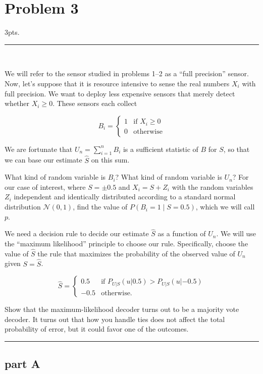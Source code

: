 \documentclass[12pt,a4paper]{article}
\begin{document}
\clearpage

\section{Problem 3}
3pts.\\

\hrule 

\

\noindent We will refer to the sensor studied in problems 1--2 as a ``full precision'' sensor. Now, let's suppose that it is resource intensive to sense the real numbers $X_i$ with full precision. We want to deploy less expensive sensors that merely detect whether $X_i \geq 0$. These sensors each collect

\[
B_i =
\begin{cases}
1 & \text{if } X_i \geq 0 \\
0 & \text{otherwise}
\end{cases}
\]

We are fortunate that $U_n = \sum_{i=1}^n B_i$ is a sufficient statistic of $B$ for $S$, so that we can base our estimate $\hat{S}$ on this sum.

What kind of random variable is $B_i$? What kind of random variable is $U_n$? For our case of interest, where $S = \pm 0.5$ and $X_i = S + Z_i$ with the random variables $Z_i$ independent and identically distributed according to a standard normal distribution $\mathcal{N}(0,1)$, find the value of $P(B_i = 1 \mid S = 0.5)$, which we will call $p$.

We need a decision rule to decide our estimate $\hat{S}$ as a function of $U_n$. We will use the ``maximum likelihood'' principle to choose our rule. Specifically, choose the value of $\hat{S}$ the rule that maximizes the probability of the observed value of $U_n$ given $S = \hat{S}$.

\[
\hat{S} =
\begin{cases}
0.5 & \text{if } P_{U|S}(u|0.5) > P_{U|S}(u|-0.5) \\
-0.5 & \text{otherwise.}
\end{cases}
\]

Show that the maximum-likelihood decoder turns out to be a majority vote decoder. It turns out that how you handle ties does not affect the total probability of error, but it could favor one of the outcomes.
\\

\hrule

\subsection{part A}
\end{document}
